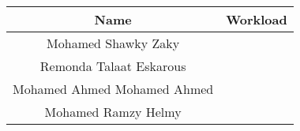 \begin{center}
\begin{tabular}{||c |c ||} 
 \hline
 Name & Workload \\ [0.5ex] 
 \hline\hline
  Mohamed Shawky Zaky & \\
 \hline
 Remonda Talaat Eskarous &  \\
  \hline
 Mohamed Ahmed Mohamed Ahmed & \\
 \hline
 Mohamed Ramzy Helmy & \\ [1ex] 
 \hline
\end{tabular}
\end{center}